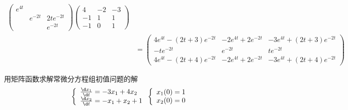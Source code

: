 \documentclass[12pt, a4paper, oneside, UTF8]{ctexbook}
\begin{document}
\begin{solution}
\begin{align*}
\begin{pmatrix}
            e^{4t}& & \\
            & e^{-2t}&2te^{-2t} \\
            & & e^{-2t}
        \end{pmatrix}\begin{pmatrix}
            4&-2&-3\\
            -1&1&1\\
            -1&0&1       
        \end{pmatrix}\\
        &=\begin{pmatrix}
            4e^{4t}-(2t+3)e^{-2t}&-2e^{4t}+2e^{-2t}&-3e^{4t}+(2t+3)e^{-2t}\\
            -te^{-2t}&e^{-2t}&te^{-2t}\\
            4e^{4t}-(2t+4)e^{-2t}&-2e^{4t}+2e^{-2t}&-3e^{4t}+(2t+4)e^{-2t}
        \end{pmatrix}
    \end{align*}
\end{solution}

\begin{question}
    用矩阵函数求解常微分方程组初值问题的解
    \begin{align*}
    \left\{
        \begin{array}{ll}
            \frac{\d x_1}{\d t}=-3x_1+4x_2\\
            \frac{\d x_2}{\d t}=-x_1+x_2+1
        \end{array}
        \right.
    \left\{
        \begin{array}{ll}
            x_1(0)=1\\
            x_2(0)=0
        \end{array}
        \right.
    \end{align*}
\end{question}
\end{document}
